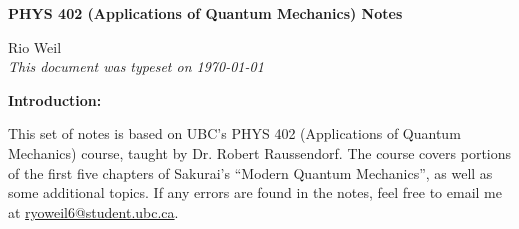 \documentclass[10pt]{article}
\begin{document}
\begin{tcolorbox}
  \begin{center}
  \begin{Large}
    \textbf{PHYS 402 (Applications of Quantum Mechanics) Notes} \\
    \vspace{5pt}
  \end{Large}
  \begin{large}
        Rio Weil \\
\vspace{5pt}
    \emph{This document was typeset on \today}
  \end{large}
  \end{center}
\end{tcolorbox}

\begin{center}
  \textbf{Introduction:}

  This set of notes is based on UBC's PHYS 402 (Applications of Quantum Mechanics) course, taught by Dr. Robert Raussendorf. The course covers portions of the first five chapters of Sakurai's ``Modern Quantum Mechanics'', as well as some additional topics. If any errors are found in the notes, feel free to email me at \href{mailto:ryoweil6@student.ubc.ca}{ryoweil6@student.ubc.ca}.

\end{center}
\tableofcontents

\newpage


\newpage


\newpage


\newpage


\newpage

\end{document}
